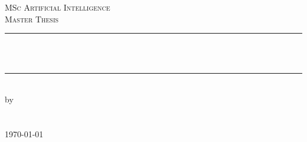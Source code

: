 
\newcommand{\red}[1]{{\color{red}{#1}}}




\begin{titlepage}

\newcommand{\HRule}{\rule{\linewidth}{0.5mm}} %
\center %
 

\textsc{\Large MSc Artificial Intelligence}\\[0.2cm]
\textsc{\Large Master Thesis}\\[0.5cm] 


\HRule \\[0.4cm]
{ \huge \bfseries \red{Type-supervising Neural \\ Program Synthesis using Typed Holes}}\\[0.4cm]
\HRule \\[0.5cm]
 

by\\[0.2cm]
\textsc{\Large \red{Tycho Grouwstra}}\\[0.2cm]
\red{6195180}\\[1cm]



{\Large \today}\\[1cm]


\end{titlepage}
